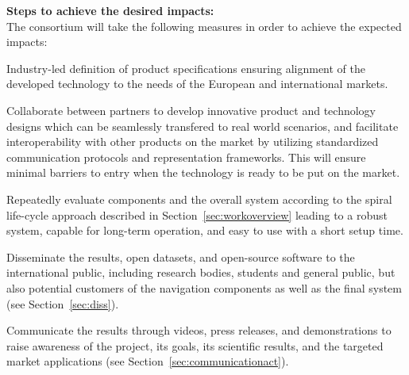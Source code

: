 \textbf{Steps to achieve the desired impacts:}\\
The \Project{} consortium will take the following measures in order to achieve the expected impacts:
\begin{denseItemize}
\item Industry-led definition of product specifications ensuring alignment of the developed technology to the needs of the European and international markets.

\item Collaborate between partners to develop innovative product and technology designs which can be seamlessly transfered to real world scenarios, and facilitate interoperability with other products on the market by utilizing standardized communication protocols and representation frameworks. This will ensure minimal barriers to entry when the technology is ready to be put on the market.

\item Repeatedly evaluate components and the overall system according to the spiral life-cycle approach described in Section~\ref{sec:workoverview} leading to a robust system, capable for long-term operation, and easy to use with a short setup time.

\item Disseminate the results, open datasets, and open-source software to the international public, including research bodies, students and general public, but also potential customers of the navigation components as well as the final system (see Section~\ref{sec:diss}). 

\item Communicate the results through videos, press releases, and demonstrations to raise awareness of the project, its goals, its scientific results, and the targeted market applications (see Section~\ref{sec:communicationact}). 
\end{denseItemize}
 
